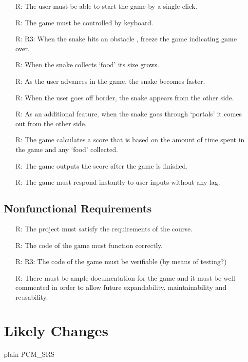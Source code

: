 \documentclass[12pt]{article}
\newcounter{reqnum} %
\begin{document}
\noindent \begin{itemize}

\item[R\refstepcounter{reqnum}\thereqnum:] The user must be able to start the game by a single click.

\item[R\refstepcounter{reqnum}\thereqnum:] The game must be controlled by keyboard.

\item[R\refstepcounter{reqnum}\thereqnum:] R3: When the snake hits an obstacle , freeze the game indicating game over.

\item[R\refstepcounter{reqnum}\thereqnum:] When the snake collects ‘food’ its size grows.
\item[R\refstepcounter{reqnum}\thereqnum:]  As the user advances in the game, the snake becomes faster.
\item[R\refstepcounter{reqnum}\thereqnum:] When the user goes off border, the snake appears from the other side.
\item[R\refstepcounter{reqnum}\thereqnum:] As an additional feature, when the snake goes through ‘portals’ it comes out from the other side.
\item[R\refstepcounter{reqnum}\thereqnum:] The game calculates a score that is based on the amount of time spent in the game and any ‘food’ collected.

\item[R\refstepcounter{reqnum}\thereqnum:] The game outputs the score after the game is finished.

\item[R\refstepcounter{reqnum}\thereqnum:] The game must respond instantly to user inputs without any lag.

\end{itemize}

\subsection{Nonfunctional Requirements}

\noindent \begin{itemize}

\item[R\refstepcounter{reqnum}\thereqnum:] The project must satisfy the requirements of the course.


\item[R\refstepcounter{reqnum}\thereqnum:] The code of the game must function correctly.

\item[R\refstepcounter{reqnum}\thereqnum:] R3: The code of the game must be verifiable (by means of testing?) 

\item[R\refstepcounter{reqnum}\thereqnum:] There must be ample documentation for the game and it must be well commented in order to allow future expandability, maintainability and reusability.

\end{itemize}


\section{Likely Changes}    



 {plain}
 {PCM_SRS}
\end{document}
